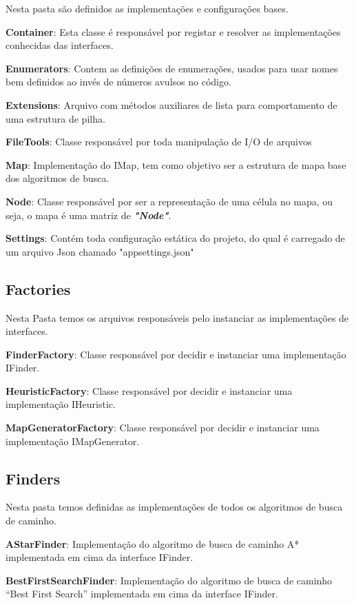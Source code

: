 Nesta pasta são definidos as implementações e configurações bases.

\textbf{Container}: Esta classe é responsável por registar e resolver as implementações conhecidas das interfaces.

\textbf{Enumerators}: Contem as definições de enumerações, usados para usar nomes bem definidos ao invés de números avulsos no código.

\textbf{Extensions}: Arquivo com métodos auxiliares de lista para comportamento de uma estrutura de pilha.

\textbf{FileTools}: Classe responsável por toda manipulação de I/O de arquivos

\textbf{Map}: Implementação do IMap, tem como objetivo ser a estrutura de mapa base dos algoritmos de busca.

\textbf{Node}: Classe responsável por ser a representação de uma célula no mapa, ou seja, o mapa é uma matriz de \textbf{\textit{"Node"}}.

\textbf{Settings}: Contém toda configuração estática do projeto, do qual é carregado de um arquivo Json chamado "appsettings.json"

\subsection{Factories}

Nesta Pasta temos os arquivos responsáveis pelo instanciar as implementações de interfaces.

\textbf{FinderFactory}: Classe responsável por decidir e instanciar uma implementação IFinder.

\textbf{HeuristicFactory}: Classe responsável por decidir e instanciar uma implementação IHeuristic.

\textbf{MapGeneratorFactory}: Classe responsável por decidir e instanciar uma implementação IMapGenerator.

\subsection{Finders}

Nesta pasta temos definidas as implementações de todos os algoritmos de busca de caminho.

\textbf{AStarFinder}: Implementação do algoritmo de busca de caminho A* implementada em cima da interface IFinder.

\textbf{BestFirstSearchFinder}: Implementação do algoritmo de busca de caminho “Best First Search” implementada em cima da interface IFinder.

